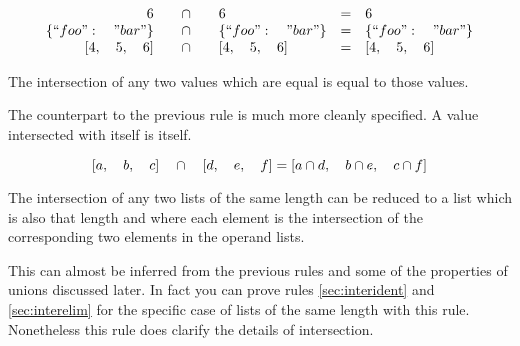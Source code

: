 \documentclass[letterpaper]{article}
\begin{document}
\begin{prule}
\label{sec:interident}
\begin{equation}
\begin{array}{rclcl}
6 \quad&\cap&\quad 6 & = & 6 \\
\{``foo":\quad"bar"\} \quad&\cap&\quad \{``foo":\quad"bar"\}  & = & \{``foo":\quad"bar"\} \\
{[}4,\quad5,\quad6] \quad&\cap&\quad {[}4,\quad5,\quad6] & = & {[}4,\quad5,\quad6] \\
\end{array}
\end{equation}

The intersection of any two values which are equal is equal to those values.
\end{prule}

The counterpart to the previous rule is much more cleanly specified. A value
intersected with itself is itself.

\begin{prule}
\label{sec:interlist}
\begin{equation}
{[}a,\quad b,\quad c] \quad\cap\quad {[}d,\quad e,\quad f]  =  {[}a\cap d,\quad
b\cap e,\quad c\cap f] \\
\end{equation}

The intersection of any two lists of the same length can be reduced to a list
which is also that length and where each element is the intersection of the
corresponding two elements in the operand lists.
\end{prule}

This can almost be inferred from the previous rules and some of the properties
of unions discussed later. In fact you can prove rules \ref{sec:interident} and
\ref{sec:interelim} for the specific case of lists of the same length with this
rule. Nonetheless this rule does clarify the details of intersection.
\end{document}
